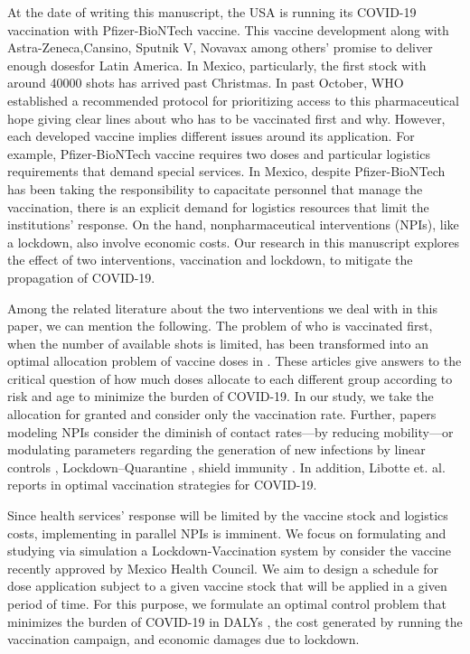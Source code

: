 At the date of writing this manuscript, the USA is running its COVID-19
vaccination with Pfizer-BioNTech vaccine. This vaccine development along with
Astra-Zeneca,Cansino, Sputnik V, Novavax among others' promise to deliver
enough dosesfor Latin America. In Mexico, particularly, the first stock with
around \num{40 000} shots has arrived past Christmas. In past October, WHO
established a recommended protocol for prioritizing access to this
pharmaceutical hope giving clear lines about who has to be vaccinated first
and why. However, each developed vaccine implies different issues around its
application. For example, Pfizer-BioNTech vaccine requires two doses and
particular logistics requirements that demand special services. In
Mexico, despite Pfizer-BioNTech has been taking the responsibility to
capacitate personnel that manage the vaccination, there is an explicit demand
for logistics resources that limit the institutions' response. On the hand,
nonpharmaceutical interventions (NPIs), like a lockdown, also involve economic
costs.  Our research in this manuscript explores the effect of two
interventions, vaccination and lockdown, to mitigate the  propagation of
COVID-19.


Among the related literature about the two interventions we deal with in this
paper, we can mention the following. The problem of who is vaccinated first,
when the number of  available shots is limited, has been transformed into an
optimal allocation problem of vaccine doses in \cite{Bubar2020,Matrajt2020}.
These articles give answers to the critical question of how much doses
allocate to each different group according to risk and age to minimize the
burden of COVID-19. In our study, we take the allocation for granted and
consider only the vaccination rate.
Further, papers modeling NPIs consider the diminish of contact rates---by
reducing mobility---or modulating parameters regarding the generation of new
infections by linear controls \cite{Naraigh2020,Ullah2020},
Lockdown--Quarantine \cite{Mandal2020},  shield immunity
\cite{Weitz2020}. In addition, Libotte et. al. reports in \cite{Libotte2020}
optimal vaccination strategies for COVID-19.

    Since health services' response will be limited by the vaccine stock
and logistics costs, implementing in parallel NPIs is imminent. We focus on
formulating and studying via simulation a Lockdown-Vaccination system by
consider the vaccine recently approved by  Mexico Health Council.     We aim to
design a schedule for dose application subject to a given vaccine stock that
will be applied in a given period of time. For this purpose, we formulate an
optimal control problem that minimizes the burden of  COVID-19 in DALYs
\cite{WhoDALY}, the cost generated by   running the vaccination
campaign, and economic damages due to lockdown.

